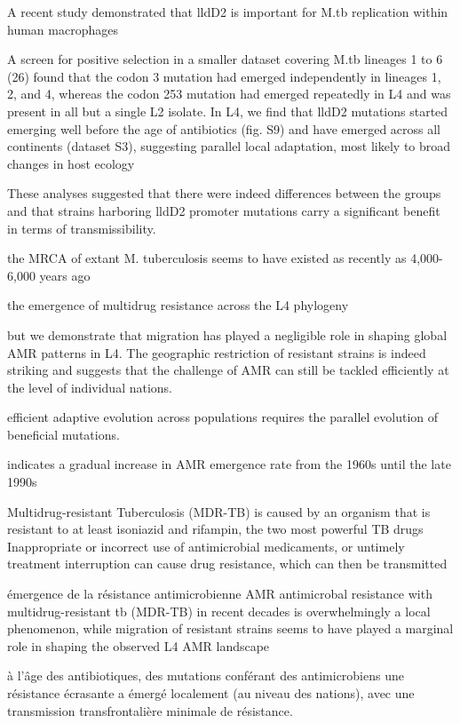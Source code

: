 \documentclass[twoside,a4paper,11pt,frenchb,openany]{report}
\begin{document}
A recent study demonstrated that lldD2 is important for
M.tb replication within human macrophages

A screen for positive
selection in a smaller dataset covering M.tb lineages 1 to 6 (26)
found that the codon 3 mutation had emerged independently in
lineages 1, 2, and 4, whereas the codon 253 mutation had emerged
repeatedly in L4 and was present in all but a single L2 isolate.
In L4, we find that lldD2 mutations started emerging well before
the age of antibiotics (fig. S9) and have emerged across all continents
(dataset S3), suggesting parallel local adaptation, most
likely to broad changes in host ecology

These analyses suggested that there were indeed differences
between the groups and that strains harboring lldD2
promoter mutations carry a significant benefit in terms of
transmissibility.

the MRCA of extant M. tuberculosis seems to have existed as recently as 4,000-6,000 years ago


the emergence of multidrug resistance across
the L4 phylogeny

but we demonstrate that migration has played a negligible
role in shaping global AMR patterns in L4. The geographic
restriction of resistant strains is indeed striking and suggests that
the challenge of AMR can still be tackled efficiently at the level
of individual nations.

efficient
adaptive evolution across populations requires the parallel evolution
of beneficial mutations.

indicates a gradual increase in AMR
emergence rate from the 1960s until the late 1990s

Multidrug-resistant Tuberculosis (MDR-TB) is caused by an organism that is resistant to at least isoniazid and rifampin, the two most powerful TB drugs
Inappropriate or incorrect use of antimicrobial medicaments, or untimely treatment interruption can cause drug resistance, which can then be transmitted

émergence de la résistance antimicrobienne AMR antimicrobal resistance with multidrug-resistant tb (MDR-TB) in recent decades is overwhelmingly
a local phenomenon, while migration
of resistant strains seems to have played a marginal role in
shaping the observed L4 AMR landscape

à l'âge des antibiotiques, des mutations conférant des antimicrobiens
une résistance écrasante a émergé localement (au niveau des nations), avec une transmission transfrontalière minimale
de résistance.
\end{document}
